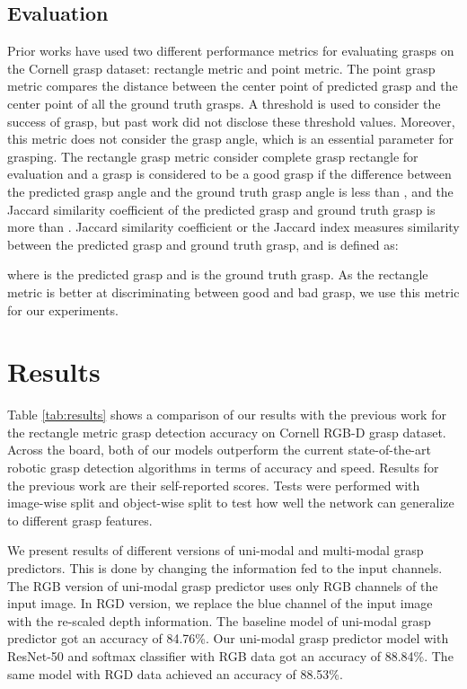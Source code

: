 \documentclass[10pt,twocolumn,letterpaper]{article}
\begin{document}
\subsection{Evaluation}
Prior works have used two different performance metrics for evaluating grasps on the Cornell grasp dataset: rectangle metric and point metric. The point grasp metric compares the distance between the center point of predicted grasp and the center point of all the ground truth grasps. A threshold is used to consider the success of grasp, but past work did not disclose these threshold values. Moreover, this metric does not consider the grasp angle, which is an essential parameter for grasping. The rectangle grasp metric consider complete grasp rectangle for evaluation and a grasp is considered to be a good grasp if the difference between the predicted grasp angle and the ground truth grasp angle is less than , and the Jaccard similarity coefficient of the predicted grasp and ground truth grasp is more than . Jaccard similarity coefficient or the Jaccard index measures similarity between the predicted grasp and ground truth grasp, and is defined as:

where  is the predicted grasp and  is the ground truth grasp. As the rectangle metric is better at discriminating between good and bad grasp, we use this metric for our experiments.




\section{Results}
Table \ref{tab:results} shows a comparison of our results with the previous work for the rectangle metric grasp detection accuracy on Cornell RGB-D grasp dataset. Across the board, both of our models outperform the current state-of-the-art robotic grasp detection algorithms in terms of accuracy and speed. Results for the previous work are their self-reported scores. Tests were performed with image-wise split and object-wise split to test how well the network can generalize to different grasp features.

We present results of different versions of uni-modal and multi-modal grasp predictors. This is done by changing the information fed to the input channels. The RGB version of uni-modal grasp predictor uses only RGB channels of the input image. In RGD version, we replace the blue channel of the input image with the re-scaled depth information. The baseline model of uni-modal grasp predictor got an accuracy of 84.76\%. Our uni-modal grasp predictor model with ResNet-50 and softmax classifier with RGB data got an accuracy of 88.84\%. The same model with RGD data achieved an accuracy of 88.53\%.
\end{document}
